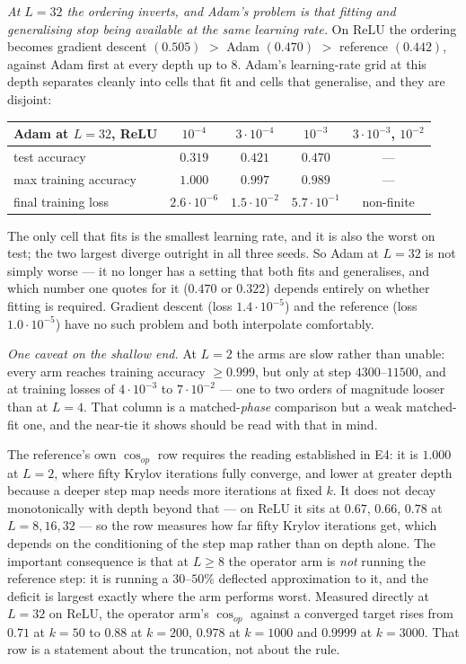 \documentclass{article} %
\theoremstyle{plain}
\theoremstyle{definition}
\theoremstyle{remark}
\begin{document}
\emph{At $L=32$ the ordering inverts, and Adam's problem is that fitting and generalising stop
being available at the same learning rate.} On ReLU the ordering becomes gradient descent $(0.505)$
$>$ Adam $(0.470)$ $>$ reference $(0.442)$, against Adam first at every depth up to $8$. Adam's
learning-rate grid at this depth separates cleanly into cells that fit and cells that generalise,
and they are disjoint:

\begin{center}\small
\begin{tabular}{lcccc}
\toprule
Adam at $L=32$, ReLU & $10^{-4}$ & $3\cdot10^{-4}$ & $10^{-3}$ & $3\cdot10^{-3}$, $10^{-2}$ \\
\midrule
test accuracy         & $0.319$ & $0.421$ & $\mathbf{0.470}$ & --- \\
max training accuracy & $1.000$ & $0.997$ & $0.989$ & --- \\
final training loss   & $2.6\cdot10^{-6}$ & $1.5\cdot10^{-2}$ & $5.7\cdot10^{-1}$ & non-finite \\
\bottomrule
\end{tabular}
\end{center}

\noindent The only cell that fits is the smallest learning rate, and it is also the worst on test;
the two largest diverge outright in all three seeds. So Adam at $L = 32$ is not simply worse --- it
no longer has a setting that both fits and generalises, and which number one quotes for it
($0.470$ or $0.322$) depends entirely on whether fitting is required. Gradient descent (loss
$1.4\cdot10^{-5}$) and the reference (loss $1.0\cdot10^{-5}$) have no such problem and both
interpolate comfortably.

\emph{One caveat on the shallow end.} At $L=2$ the arms are slow rather than unable: every arm
reaches training accuracy $\ge 0.999$, but only at step $4300$--$11500$, and at training losses of
$4\cdot10^{-3}$ to $7\cdot10^{-2}$ --- one to two orders of magnitude looser than at $L=4$. That
column is a matched-\emph{phase} comparison but a weak matched-fit one, and the near-tie it shows
should be read with that in mind.

The reference's own $\cos_{op}$ row requires the reading established in E4: it is $1.000$ at $L=2$,
where fifty Krylov iterations fully converge, and lower at greater depth because a deeper step map
needs more iterations at fixed $k$. It does not decay monotonically with depth beyond that --- on ReLU it sits at
$0.67$, $0.66$, $0.78$ at $L = 8, 16, 32$ --- so the row measures how far fifty Krylov iterations
get, which depends on the conditioning of the step map rather than on depth alone. The important
consequence is that at $L \ge 8$ the operator arm is \emph{not} running the reference step: it is
running a $30$--$50\%$ deflected approximation to it, and the deficit is largest exactly where the
arm performs worst. Measured directly at $L = 32$ on ReLU, the operator arm's
$\cos_{op}$ against a converged target rises from $0.71$ at $k = 50$ to $0.88$ at $k = 200$,
$0.978$ at $k = 1000$ and $0.9999$ at $k = 3000$. That row is a statement about the truncation, not
about the rule.
\end{document}
